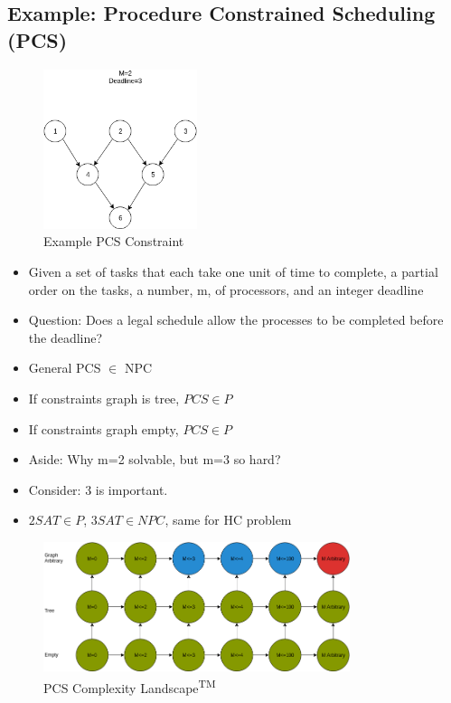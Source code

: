 \documentclass[12pt, letter]{article}
\begin{document}
\subsection*{Example: Procedure Constrained Scheduling (PCS)}
\begin{figure}[h]
	\centering
	\includegraphics[width=0.4\textwidth]{schedule}
	\caption{Example PCS Constraint}
	\label{fig:schedule}
\end{figure}
\begin{itemize}
	\item Given a set of tasks that each take one unit of time to complete, a partial order on the tasks, a number, m, of processors, and an integer deadline
	\item Question: Does a legal schedule allow the processes to be completed before the deadline?
	\item General PCS $\in$ NPC
	\item If constraints graph is tree, $PCS \in P$
	\item If constraints graph empty, $PCS \in P$
	\item Aside: Why m=2 solvable, but m=3 so hard?
	\item Consider: 3 is important. 
	\item $2SAT \in P$, $3SAT \in NPC$, same for HC problem
\end{itemize}

\begin{figure}[h]
	\centering
	\includegraphics[width=0.8\textwidth]{schedule-landscape}
	\caption{PCS Complexity Landscape\textsuperscript{TM}}
	\label{fig:schedule-landscape}
\end{figure}
\end{document}
